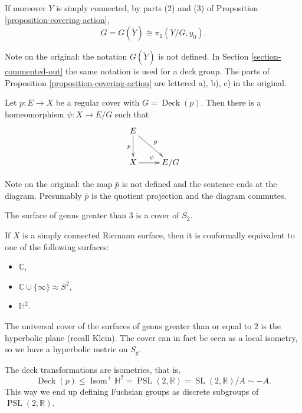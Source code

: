 \begin{corollary}
\label{corollary-simply-connected}
If moreover $Y$ is simply connected, by
parts (2) and (3) of
Proposition
\ref{proposition-covering-action},
$$
G=G(\tilde{Y})\cong\pi_1(Y/G,y_0).
$$
\end{corollary}

Note on the original: the notation
$G(\tilde{Y})$ is not defined. In
Section \ref{section-commented-out} the
same notation is used for a deck group.
The parts of
Proposition
\ref{proposition-covering-action} are
lettered a), b), c) in the original.

\begin{proposition}
\label{proposition-regular-quotient}
Let $p:E\to X$ be a regular cover with
$G=\operatorname{Deck}(p)$. Then there
is a homeomorphism $\psi:X\to E/G$ such
that
$$
\xymatrix{
E \ar[d]_{p} \ar[dr]^{\bar{p}} \\
X \ar[r]^{\psi} & E/G
}
$$
\end{proposition}

Note on the original: the map $\bar{p}$
is not defined and the sentence ends at
the diagram. Presumably $\bar{p}$ is the
quotient projection and the diagram
commutes.

\begin{example}
\label{example-genus-cover}
The surface of genus greater than $3$ is
a cover of $S_2$.
\end{example}

\begin{theorem}
\label{theorem-uniformization}
If $X$ is a simply connected Riemann
surface, then it is conformally
equivalent to one of the following
surfaces:
\begin{itemize}
\item $\mathbb{C}$,
\item $\mathbb{C}\cup\{\infty\}
\approx S^2$,
\item $\mathbb{H}^2$.
\end{itemize}
\end{theorem}

\begin{example}
\label{example-hyperbolic-plane}
The universal cover of the surfaces of
genus greater than or equal to $2$ is
the hyperbolic plane (recall Klein). The
cover can in fact be seen as a local
isometry, so we have a hyperbolic metric
on $S_g$.

The deck transformations are isometries,
that is,
$$
\operatorname{Deck}(p)\leq
\operatorname{Isom}^+\mathbb{H}^2
=\operatorname{PSL}(2,\mathbb{R})
=\operatorname{SL}(2,\mathbb{R})
/A\sim-A.
$$
This way we end up defining Fuchsian
groups as discrete subgroups of
$\operatorname{PSL}(2,\mathbb{R})$.
\end{example}

